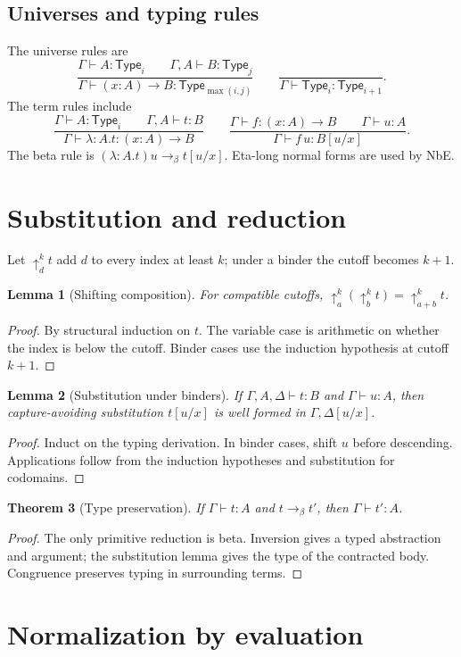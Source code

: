 \documentclass[11pt,a4paper]{article}
\newtheorem{theorem}{Theorem}[section]
\newtheorem{lemma}[theorem]{Lemma}
\newcommand{\Ty}{\mathsf{Type}}
\begin{document}
\subsection{Universes and typing rules}
The universe rules are
\[
\frac{\Gamma\vdash A:\Ty_i\qquad \Gamma,A\vdash B:\Ty_j}{\Gamma\vdash (x:A)\to B:\Ty_{\max(i,j)}}\qquad
\frac{}{\Gamma\vdash \Ty_i:\Ty_{i+1}}.
\]
The term rules include
\[
\frac{\Gamma\vdash A:\Ty_i\qquad\Gamma,A\vdash t:B}{\Gamma\vdash\lambda:A.t:(x:A)\to B}
\qquad
\frac{\Gamma\vdash f:(x:A)\to B\qquad\Gamma\vdash u:A}{\Gamma\vdash f\,u:B[u/x]}.
\]
The beta rule is $(\lambda:A.t)u\to_\beta t[u/x]$. Eta-long normal forms are used by NbE.

\section{Substitution and reduction}
Let $\uparrow^k_d t$ add $d$ to every index at least $k$; under a binder the cutoff becomes $k+1$.
\begin{lemma}[Shifting composition]
For compatible cutoffs, $\uparrow^k_a(\uparrow^k_b t)=\uparrow^k_{a+b}t$.
\end{lemma}
\begin{proof}
By structural induction on $t$. The variable case is arithmetic on whether the index is below the cutoff. Binder cases use the induction hypothesis at cutoff $k+1$.
\end{proof}
\begin{lemma}[Substitution under binders]
If $\Gamma,A,\Delta\vdash t:B$ and $\Gamma\vdash u:A$, then capture-avoiding substitution $t[u/x]$ is well formed in $\Gamma,\Delta[u/x]$.
\end{lemma}
\begin{proof}
Induct on the typing derivation. In binder cases, shift $u$ before descending. Applications follow from the induction hypotheses and substitution for codomains.
\end{proof}
\begin{theorem}[Type preservation]
If $\Gamma\vdash t:A$ and $t\to_\beta t'$, then $\Gamma\vdash t':A$.
\end{theorem}
\begin{proof}
The only primitive reduction is beta. Inversion gives a typed abstraction and argument; the substitution lemma gives the type of the contracted body. Congruence preserves typing in surrounding terms.
\end{proof}

\section{Normalization by evaluation}
\end{document}
